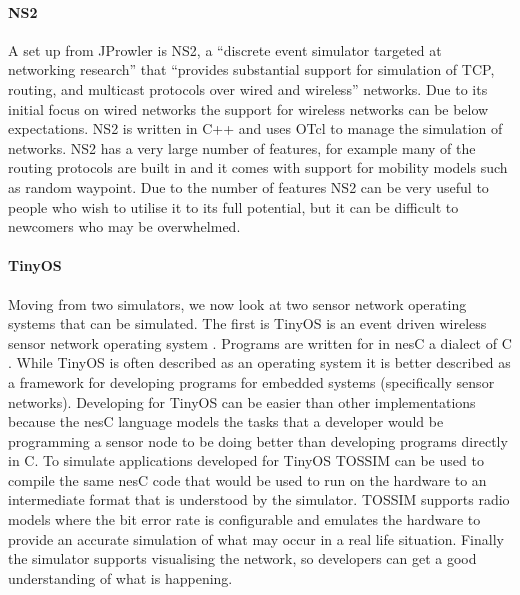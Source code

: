 \paragraph{NS2} A set up from JProwler is NS2, a ``discrete event simulator targeted at networking research'' \cite{NS2} that ``provides substantial support for simulation of TCP, routing, and multicast protocols over wired and wireless'' networks. Due to its initial focus on wired networks the support for wireless networks can be below expectations. NS2 is written in C++ and uses OTcl to manage the simulation of networks. NS2 has a very large number of features, for example many of the routing protocols are built in and it comes with support for mobility models such as random waypoint. Due to the number of features NS2 can be very useful to people who wish to utilise it to its full potential, but it can be difficult to newcomers who may be overwhelmed.

\paragraph{TinyOS} Moving from two simulators, we now look at two sensor network operating systems that can be simulated. The first is TinyOS is an event driven wireless sensor network operating system \cite{tinyos}. Programs are written for in nesC a dialect of C \cite{Gay:2003:NLH:780822.781133}. While TinyOS is often described as an operating system it is better described as a framework for developing programs for embedded systems (specifically sensor networks). Developing for TinyOS can be easier than other implementations because the nesC language models the tasks that a developer would be programming a sensor node to be doing better than developing programs directly in C. To simulate applications developed for TinyOS TOSSIM \cite{levis2003tossim} can be used to compile the same nesC code that would be used to run on the hardware to an intermediate format that is understood by the simulator. TOSSIM supports radio models where the bit error rate is configurable and emulates the hardware to provide an accurate simulation of what may occur in a real life situation. Finally the simulator supports visualising the network, so developers can get a good understanding of what is happening.


